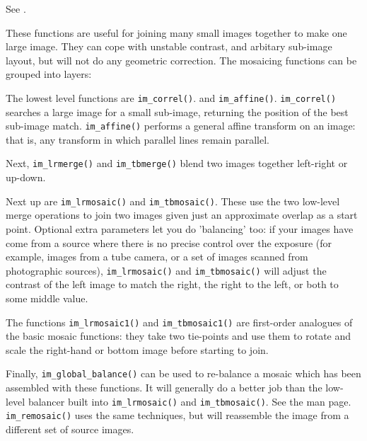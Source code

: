 See .

These functions are useful for joining many small images together to make one
large image. They can cope with unstable contrast, and arbitary sub-image
layout, but will not do any geometric correction. The mosaicing functions
can be grouped into layers:

The lowest level functions are \verb+im_correl()+. and \verb+im_affine()+.
\verb+im_correl()+  searches a large image for a small sub-image, returning
the position of the best sub-image match.  \verb+im_affine()+ performs
a general affine transform on an image: that is, any transform in which
parallel lines remain parallel.

Next, \verb+im_lrmerge()+ and \verb+im_tbmerge()+ blend two images together
left-right or up-down.

Next up are  \verb+im_lrmosaic()+ and \verb+im_tbmosaic()+. These use the
two low-level merge operations to join two images given just an approximate
overlap as a start point. Optional extra parameters let you do 'balancing'
too: if your images have come from a source where there is no precise
control over the exposure (for example, images from a tube camera, or a
set of images scanned from photographic sources), \verb+im_lrmosaic()+
and \verb+im_tbmosaic()+ will adjust the contrast of the left image to
match the right, the right to the left, or both to some middle value.

The functions \verb+im_lrmosaic1()+ and \verb+im_tbmosaic1()+ are first-order
analogues of the basic mosaic functions: they take two tie-points and use
them to rotate and scale the right-hand or bottom image before starting to join.

Finally, \verb+im_global_balance()+ can be used to re-balance a mosaic
which has been assembled with these functions. It will generally do a
better job than the low-level balancer built into \verb+im_lrmosaic()+
and \verb+im_tbmosaic()+. See the man page. \verb+im_remosaic()+ uses the same
techniques, but will reassemble the image from a different set of source
images.

